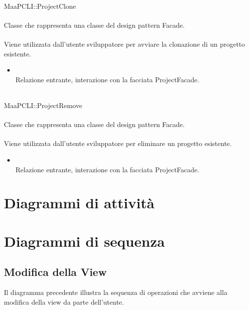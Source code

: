 \\
MaaPCLI::ProjectClone\\
\\
Classe che rappresenta una classe del design pattern Facade.\\
\\
Viene utilizzata dall'utente sviluppatore per avviare la clonazione di un progetto esistente.\\
\begin{itemize}
\item{}\\
Relazione entrante, interazione con la facciata ProjectFacade.
\end{itemize}

\\
MaaPCLI::ProjectRemove\\
\\
Classe che rappresenta una classe del design pattern Facade.\\
\\
Viene utilizzata dall'utente sviluppatore per eliminare un progetto esistente.\\
\begin{itemize}
\item{}\\
Relazione entrante, interazione con la facciata ProjectFacade.
\end{itemize}


\newpage
\section{Diagrammi di attività}
\label{attivita}


\section{Diagrammi di sequenza}
\label{sequenza}
\subsection{Modifica della View}
Il diagramma precedente illustra la sequenza di operazioni che avviene alla modifica della view da parte dell'utente.

